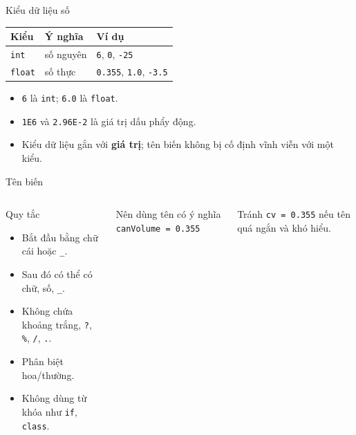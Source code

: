\documentclass[aspectratio=169,10pt]{beamer}
\begin{document}
\begin{frame}{Kiểu dữ liệu số}
\begin{table}
\centering
\begin{tabular}{lll}
\toprule
Kiểu & Ý nghĩa & Ví dụ \\
\midrule
\texttt{int} & số nguyên & \texttt{6}, \texttt{0}, \texttt{-25} \\
\texttt{float} & số thực & \texttt{0.355}, \texttt{1.0}, \texttt{-3.5} \\
\bottomrule
\end{tabular}
\end{table}
\begin{itemize}
  \item \texttt{6} là \texttt{int}; \texttt{6.0} là \texttt{float}.
  \item \texttt{1E6} và \texttt{2.96E-2} là giá trị dấu phẩy động.
  \item Kiểu dữ liệu gắn với \textbf{giá trị}; tên biến không bị cố định vĩnh viễn với một kiểu.
\end{itemize}
\end{frame}

\begin{frame}{Tên biến}
\begin{columns}[T,onlytextwidth]
\begin{block}{Quy tắc}
\small
\begin{itemize}
  \item Bắt đầu bằng chữ cái hoặc \texttt{\_}.
  \item Sau đó có thể có chữ, số, \texttt{\_}.
  \item Không chứa khoảng trắng, \texttt{?}, \texttt{\%}, \texttt{/}, \texttt{.}.
  \item Phân biệt hoa/thường.
  \item Không dùng từ khóa như \texttt{if}, \texttt{class}.
\end{itemize}
\end{block}
\begin{block}{Nên dùng tên có ý nghĩa}
\texttt{canVolume = 0.355}
\end{block}
\begin{alertblock}{Tránh}
\texttt{cv = 0.355} nếu tên quá ngắn và khó hiểu.
\end{alertblock}
\end{columns}
\end{frame}
\end{document}

